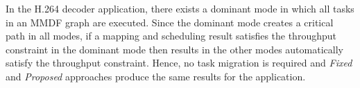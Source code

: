 \documentclass[prodmode,acmtecs]{acmsmall}
\begin{document}
In the H.264 decoder application, there exists a dominant mode in which all tasks in an MMDF graph are executed. Since the dominant mode creates a critical path in all modes, if a mapping and scheduling result satisfies the throughput constraint in the dominant mode then results in the other modes automatically satisfy the throughput constraint. Hence, no task migration is required and \textit{Fixed} and \textit{Proposed} approaches produce the same results for the application.

\begin{table}[ht]
\centering
{}
\end{table}
\end{document}
